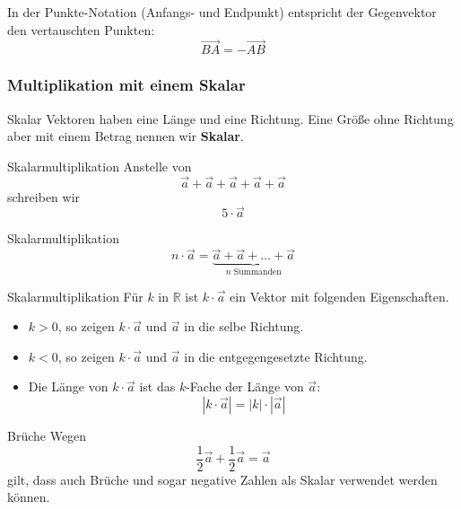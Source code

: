 
\begin{bemerkung}{}{}
  In der Punkte-Notation (Anfangs- und Endpunkt) entspricht der
  Gegenvektor  den vertauschten Punkten:
  $$\overrightarrow{BA} = - \overrightarrow{AB}$$
\end{bemerkung}


\newpage


\subsubsection{Multiplikation mit einem Skalar}
\begin{definition}{Skalar}{}
  Vektoren haben eine Länge und eine Richtung. Eine Größe ohne
  Richtung aber mit einem Betrag nennen wir \textbf{Skalar}. 
\end{definition}

\begin{beispiel}{Skalarmultiplikation}{}
  Anstelle von
  $$\vec{a}+\vec{a}+\vec{a}+\vec{a}+\vec{a}$$
  schreiben wir
  $$5\cdot{}\vec{a}$$
\end{beispiel}

\begin{definition}{Skalarmultiplikation}{}
  $$n\cdot{}\vec{a} = \underbrace{\vec{a} + \vec{a} + ... + \vec{a}}_{n \text{ Summanden}}$$
\end{definition}

\begin{definition}{Skalarmultiplikation}{}
  Für $k$ in $\mathbb{R}$ ist $k\cdot{}\vec{a}$ ein Vektor mit
  folgenden Eigenschaften.

  \begin{itemize}
  \item $k>0$, so zeigen $k\cdot{}\vec{a}$ und $\vec{a}$ in die selbe Richtung.
  \item $k<0$, so zeigen $k\cdot{}\vec{a}$ und $\vec{a}$ in die entgegengesetzte Richtung.
  \item Die Länge von $k\cdot{}\vec{a}$ ist das $k$-Fache der Länge
    von $\vec{a}$: $$|k\cdot{}\vec{a}| = |k|\cdot{}|\vec{a}|$$
   \end{itemize}
\end{definition}

\begin{beispiel}{Brüche}{}
  Wegen
  $$\frac12\vec{a} + \frac12\vec{a} = \vec{a}$$
  gilt, dass auch Brüche und sogar  negative Zahlen als Skalar
  verwendet werden können.
\end{beispiel}

